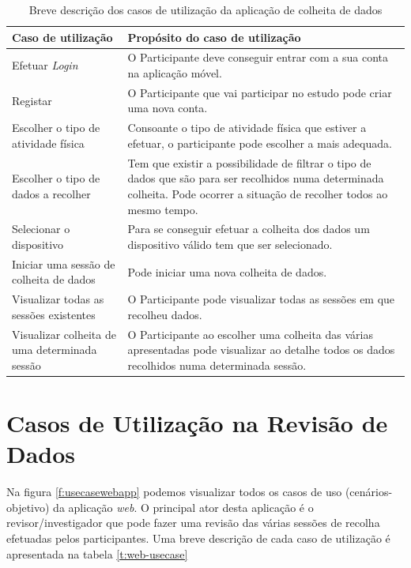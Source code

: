 \begin{table}[H]
\centering
\label{t:and-usecase}
\begin{tabularx}{1\textwidth}{|p{4cm}|p{10.7cm}|}
\rowcolor[HTML]{FFCE93} \hline
\textbf{Caso de utilização} &  \textbf{Propósito do caso de utilização}  \\
\hline
Efetuar \textit{Login}  & O Participante deve conseguir entrar com a sua conta na aplicação móvel. \\ \hline

Registar & O Participante que vai participar no estudo pode criar uma nova  conta. \\ \hline

Escolher o tipo de atividade física & Consoante o tipo de atividade física que estiver a efetuar, o participante pode escolher a mais adequada.\\ \hline

Escolher o tipo de dados a recolher & Tem que existir a possibilidade de filtrar o tipo de dados que são para ser recolhidos numa determinada colheita. Pode ocorrer a situação de recolher todos ao mesmo tempo. \\ \hline

Selecionar o dispositivo  & Para se conseguir efetuar a colheita dos dados um dispositivo válido tem que ser selecionado. \\ \hline

Iniciar uma sessão de colheita de dados & Pode iniciar uma nova colheita de dados. \\ \hline

Visualizar todas as sessões existentes & O Participante pode visualizar todas as sessões em que recolheu dados. \\ \hline

Visualizar colheita de uma determinada sessão & O Participante ao escolher uma colheita das várias apresentadas pode visualizar ao detalhe todos os dados recolhidos numa determinada sessão. \\ \hline    

\end{tabularx}
\caption{Breve descrição dos casos de utilização da aplicação de colheita de dados}
\end{table}

\section{Casos de Utilização na Revisão de Dados}

Na figura \ref{f:usecasewebapp} podemos visualizar todos os casos de uso (cenários-objetivo) da aplicação \textit{web}. O principal ator desta aplicação é o revisor/investigador que pode fazer uma revisão das várias sessões de recolha efetuadas pelos participantes. Uma breve descrição de cada caso de utilização é apresentada na tabela \ref{t:web-usecase}

